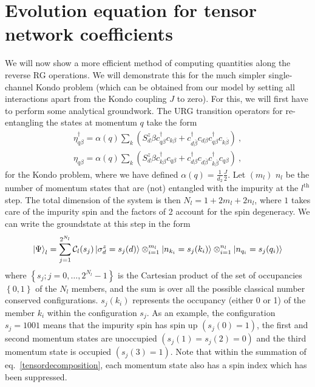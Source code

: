 \documentclass[prb]{revtex4-2}
\begin{document}
\section{Evolution equation for tensor network coefficients}
We will now show a more efficient method of computing quantities along the reverse RG operations. We will demonstrate this for the much simpler single-channel Kondo problem (which can be obtained from our model by setting all interactions apart from the Kondo coupling \(J\) to zero). For this, we will first have to perform some analytical groundwork. The URG transition operators for re-entangling the states at momentum \(q\) take the form
\begin{equation}\begin{aligned}
	\eta_{q\beta}^\dagger = \alpha(q)\sum_{k} \left( S_d^z \beta c^\dagger_{q\beta}c_{k\beta} + c^\dagger_{d\overline\beta}c_{d\beta}c^\dagger_{q\beta}c_{k\overline\beta}\right) ~,\\
	\eta_{q\beta} = \alpha(q)\sum_{k} \left( S_d^z \beta c^\dagger_{k\beta}c_{q\beta} + c^\dagger_{d\beta}c_{d\overline\beta}c^\dagger_{k\overline\beta}c_{q\beta}\right)~,
\end{aligned}\end{equation}
for the Kondo problem, where we have defined \(\alpha(q) = \frac{1}{d_2}\frac{J}{2}\). Let \((m_l)\) \(n_l\) be the number of momentum states that are (not) entangled with the impurity at the \(l^\text{th}\) step. The total dimension of the system is then \(N_l = 1 + 2m_l + 2n_l\), where \(1\) takes care of the impurity spin and the factors of 2 account for the spin degeneracy. We can write the groundstate at this step in the form
\begin{equation}\begin{aligned}
	\ket{\Psi}_l = \sum_{j=1}^{2^{N_l}} \mathcal{C}_l(s_j)\ket{\sigma^z_d=s_j(d)}\otimes_{i=1}^{m_l}\ket{n_{k_i}=s_j(k_i) }\otimes_{i=1}^{n_l}\ket{n_{q_i}=s_j(q_i)}\label{tensordecomposition}
\end{aligned}\end{equation}
where \(\left\{ s_j; j=0,\ldots,2^{N_l}-1\right\} \) is the Cartesian product of the set of occupancies \(\left\{ 0,1 \right\} \) of the \(N_l\) members, and the sum is over all the possible classical number conserved configurations. \(s_j(k_i)\) represents the occupancy (either 0 or 1) of the member \(k_i\) within the configuration \(s_j\). As an example, the configuration \(s_j = 1001\) means that the impurity spin has spin up \(\left( s_j(0) = 1 \right) \), the first and second momentum states are unoccupied \(\left( s_j(1) = s_j(2) = 0 \right) \) and the third momentum state is occupied \(\left( s_j(3) = 1 \right) \). Note that within the summation of eq.~\ref{tensordecomposition}, each momentum state also has a spin index which has been suppressed.
\end{document}
